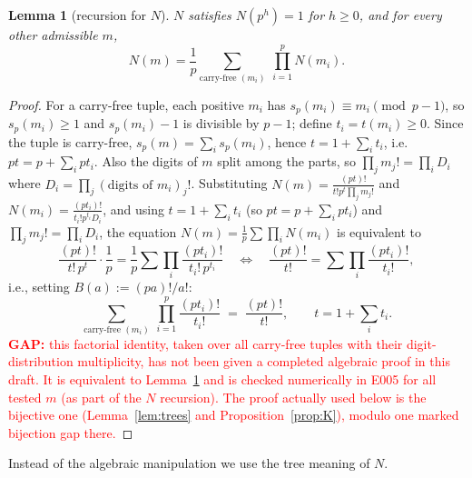 \documentclass[11pt]{amsart}
\newtheorem{lemma}[theorem]{Lemma}
\theoremstyle{definition}
\theoremstyle{remark}
\newcommand{\GAP}[1]{\textcolor{red}{\textbf{GAP: }#1}}
\newcommand{\Nn}{N}
\newcommand{\sd}{s_p}
\begin{document}
\begin{lemma}[recursion for $\Nn$]\label{lem:Nrec}
$\Nn$ satisfies $\Nn(p^h)=1$ for $h\ge0$, and for every other admissible $m$,
\begin{equation}\label{eq:Nrec}
  \Nn(m)=\frac1p\sum_{\text{carry-free }(m_i)}\ \prod_{i=1}^p\Nn(m_i).
\end{equation}
\end{lemma}
\begin{proof}
For a carry-free tuple, each positive $m_i$ has $\sd(m_i)\equiv
m_i\pmod{p-1}$, so $\sd(m_i)\ge1$ and $\sd(m_i)-1$ is divisible by $p-1$;
define $t_i=t(m_i)\ge0$. Since the tuple is carry-free,
$\sd(m)=\sum_i\sd(m_i)$, hence $t=1+\sum_it_i$, i.e.\
$pt=p+\sum_i pt_i$. Also the digits of $m$ split among the parts, so
$\prod_jm_j!=\prod_i D_i$ where $D_i=\prod_j(\text{digits of }m_i)_j!$.
Substituting $\Nn(m)=\frac{(pt)!}{t!p^t\prod_jm_j!}$ and
$\Nn(m_i)=\frac{(pt_i)!}{t_i!p^{t_i}D_i}$, and using $t=1+\sum_it_i$
(so $pt=p+\sum_ipt_i$) and $\prod_jm_j!=\prod_iD_i$, the equation
$\Nn(m)=\frac1p\sum\prod_i\Nn(m_i)$ is equivalent to
\[
  \frac{(pt)!}{t!\,p^t}\cdot\frac1p
  =\frac1p\sum\prod_i\frac{(pt_i)!}{t_i!\,p^{t_i}}
  \quad\Longleftrightarrow\quad
  \frac{(pt)!}{t!}=\sum\prod_i\frac{(pt_i)!}{t_i!},
\]
i.e., setting $B(a):=(pa)!/a!$:
\begin{equation}\label{eq:ptsum}
  \sum_{\text{carry-free }(m_i)}\ \prod_{i=1}^p\frac{(pt_i)!}{t_i!}
   \;=\;\frac{(pt)!}{t!},
  \qquad t=1+\textstyle\sum_i t_i .
\end{equation}
\GAP{this factorial identity, taken over all carry-free tuples with their
digit-distribution multiplicity, has not been given a completed algebraic
proof in this draft. It is equivalent to Lemma~\ref{lem:Nrec} and is checked
numerically in E005 for all tested $m$ (as part of the $\Nn$ recursion). The
proof actually used below is the bijective one (Lemma~\ref{lem:trees} and
Proposition~\ref{prop:K}), modulo one marked bijection gap there.}
\end{proof}

Instead of the algebraic manipulation we use the tree meaning of $\Nn$.
\end{document}
